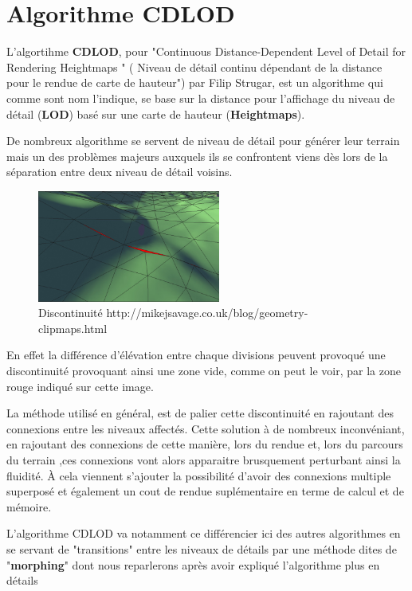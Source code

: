 \documentclass[12pt]{report}
\begin{document}
  \chapter{Algorithme CDLOD}
  
  L'algortihme \textbf{CDLOD}, pour "Continuous Distance-Dependent Level of Detail for Rendering Heightmaps " ( 
  Niveau de détail continu dépendant de la distance pour le rendue de carte de hauteur") par Filip Strugar, est un algorithme qui comme sont nom l'indique, se base sur la distance pour l'affichage du niveau de détail (\textbf{LOD}) basé sur une carte de hauteur (\textbf{Heightmaps}).
  
  De nombreux algorithme se servent de niveau de détail pour générer leur terrain mais un des problèmes majeurs auxquels ils se confrontent viens dès lors de la séparation entre deux niveau de détail voisins.\\
  \begin{figure}
  \includegraphics[width=6cm]{img/seams.png}
    \caption{Discontinuité http://mikejsavage.co.uk/blog/geometry-clipmaps.html}
    \label{fig:seams}
  \end{figure}
  
  \vspace{0.5cm}
  En effet la différence d'élévation entre chaque divisions peuvent provoqué une discontinuité provoquant ainsi une zone vide, comme on peut le voir, par la zone rouge indiqué sur cette image. 
  
  
  \vspace{2.8cm}
  La méthode utilisé en général, est de palier cette discontinuité en rajoutant des connexions entre les niveaux affectés. Cette solution à de nombreux inconvéniant, en rajoutant des connexions de cette manière, lors du rendue et, lors du parcours du terrain ,ces connexions vont alors apparaitre brusquement perturbant ainsi la fluidité. À cela viennent s'ajouter la possibilité d'avoir des connexions multiple superposé et également un cout de rendue suplémentaire en terme de calcul et de mémoire.
  
  L'algorithme CDLOD va notamment ce différencier ici des autres algorithmes en se servant de "transitions" entre les niveaux de détails par une méthode dites de "\textbf{morphing}" dont nous reparlerons après avoir expliqué l'algorithme plus en détails
  
\end{document}

